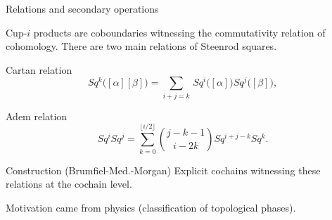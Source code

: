 \begin{frame}{Relations and secondary operations}

	\pause

	Cup-$i$ products are coboundaries witnessing the commutativity relation of cohomology.
	\pause
	There are two main relations of Steenrod squares.
	\begin{block}{Cartan relation}
		\vspace*{-10pt}
		\begin{equation*}
			Sq^k \big( [\alpha] [\beta] \big) =
			\sum_{i+j=k} \, Sq^i\big([\alpha]\big) Sq^j\big([\beta]\big),
		\end{equation*}
	\end{block}

	\pause

	\begin{block}{Adem relation}
		\vspace*{-15pt}
		\begin{equation*}
			Sq^i Sq^j =
			\sum_{k=0}^{\lfloor i/2 \rfloor} \binom{j-k-1}{i-2k} Sq^{i+j-k} Sq^k.
		\end{equation*}
	\end{block}

	\pause

	\begin{block}{Construction (Brumfiel-Med.-Morgan)}
		Explicit cochains witnessing these relations at the cochain level.
	\end{block}

	\pause

	Motivation came from physics (classification of topological phases).
\end{frame}